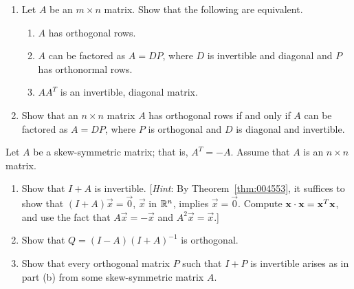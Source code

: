 \documentclass{ximera}
\begin{document}
\begin{problem}\label{prob:ortho23}
\begin{enumerate} 
\item Let $A$ be an $m \times n$ matrix. Show that the following are equivalent.


\begin{enumerate}[label={\roman*.}]
\item $A$ has orthogonal rows.

\item $A$ can be factored as $A = DP$, where $D$ is invertible and diagonal and $P$ has orthonormal rows.

\item $AA^{T}$ is an invertible, diagonal matrix.

\end{enumerate}
\item Show that an $n \times n$ matrix $A$ has orthogonal rows if and only if $A$ can be factored as $A = DP$, where $P$ is orthogonal and $D$ is diagonal and invertible.

\end{enumerate}
\end{problem}

\begin{problem}\label{prob:ortho24}
Let $A$ be a skew-symmetric matrix; that is, $A^{T} = -A$. Assume that $A$ is an $n \times n$ matrix.


\begin{enumerate} 
\item Show that $I + A$ is invertible. [\textit{Hint}: By Theorem~\ref{thm:004553}, it suffices to show that $(I + A)\vec{x} = \vec{0}$, $\vec{x}$ in $\mathbb{R}^n$, implies $\vec{x} = \vec{0}$. Compute $\mathbf{x} \cdot \mathbf{x} = \mathbf{x}^{T}\mathbf{x}$, and use the fact that $A\vec{x} = -\vec{x}$ and $A^{2}\vec{x} = \vec{x}$.]

\item Show that $Q = (I - A)(I + A)^{-1}$ is orthogonal.

\item Show that every orthogonal matrix $P$ such that $I + P$ is invertible arises as in part (b) from some skew-symmetric matrix $A$. \newline [\textit{Hint}: Solve $P = (I - A)(I + A)^{-1}$ for $A$.]

\end{enumerate}

\end{problem}
\end{document}

